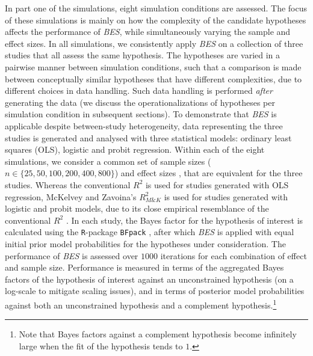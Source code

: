 \documentclass[
]{article}
\begin{document}
In part one of the simulations, eight simulation conditions are
assessed. The focus of these simulations is mainly on how the complexity
of the candidate hypotheses affects the performance of \emph{BES}, while
simultaneously varying the sample and effect sizes. In all simulations,
we consistently apply \emph{BES} on a collection of three studies that
all assess the same hypothesis. The hypotheses are varied in a pairwise
manner between simulation conditions, such that a comparison is made
between conceptually similar hypotheses that have different
complexities, due to different choices in data handling. Such data
handling is performed \emph{after} generating the data (we discuss the
operationalizations of hypotheses per simulation condition in subsequent
sections). To demonstrate that \emph{BES} is applicable despite
between-study heterogeneity, data representing the three studies is
generated and analysed with three statistical models: ordinary least
squares (OLS), logistic and probit regression. Within each of the eight
simulations, we consider a common set of sample sizes
(\(n \in \{25, 50, 100, 200, 400, 800\}\)) and effect sizes
\citep[\(R^2 \in \{0.02, 0.09, 0.25\}\), corresponding to small, medium
and large effects as defined by][]{cohen_1988}, that are equivalent for
the three studies. Whereas the conventional \(R^2\) is used for studies
generated with OLS regression, McKelvey and Zavoina's \(R^2_{M\&K}\)
\citeyearpar{mckelvey_zavoina_1975} is used for studies generated with
logistic and probit models, due to its close empirical resemblance of
the conventional \(R^2\)
\citep{hagle_mitchell_goodness_1992, demaris_explained_2002}. In each
study, the Bayes factor for the hypothesis of interest is calculated
using the \texttt{R}-package \texttt{BFpack} \citep{BFpack}, after which
\emph{BES} is applied with equal initial prior model probabilities for
the hypotheses under consideration. The performance of \emph{BES} is
assessed over \(1000\) iterations for each combination of effect and
sample size. Performance is measured in terms of the aggregated Bayes
factors of the hypothesis of interest against an unconstrained
hypothesis (on a log-scale to mitigate scaling issues), and in terms of
posterior model probabilities against both an unconstrained hypothesis
and a complement hypothesis.\footnote{Note that Bayes factors against a
  complement hypothesis become infinitely large when the fit of the
  hypothesis tends to \(1\).}
\end{document}
